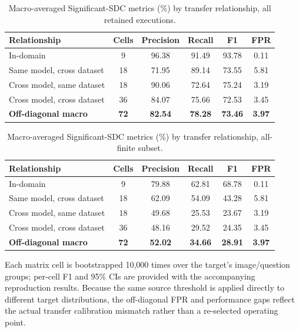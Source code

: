 \begin{table}[!ht]
\caption{Macro-averaged Significant-SDC metrics (\%) by transfer relationship, all retained executions.}
\label{tab:A9}
\centering
\small
\begin{tabular}{lccccc}
\toprule
\textbf{Relationship} & \textbf{Cells} & \textbf{Precision} & \textbf{Recall} & \textbf{F1} & \textbf{FPR} \\
\midrule
In-domain & 9 & 96.38 & 91.49 & 93.78 & 0.11 \\
Same model, cross dataset & 18 & 71.95 & 89.14 & 73.55 & 5.81 \\
Cross model, same dataset & 18 & 90.06 & 72.64 & 75.24 & 3.19 \\
Cross model, cross dataset & 36 & 84.07 & 75.66 & 72.53 & 3.45 \\
\midrule
\textbf{Off-diagonal macro} & \textbf{72} & \textbf{82.54} & \textbf{78.28} & \textbf{73.46} & \textbf{3.97} \\
\bottomrule
\end{tabular}
\end{table}

\begin{table}[!ht]
\caption{Macro-averaged Significant-SDC metrics (\%) by transfer relationship, all-finite subset.}
\label{tab:A10}
\centering
\small
\begin{tabular}{lccccc}
\toprule
\textbf{Relationship} & \textbf{Cells} & \textbf{Precision} & \textbf{Recall} & \textbf{F1} & \textbf{FPR} \\
\midrule
In-domain & 9 & 79.88 & 62.81 & 68.78 & 0.11 \\
Same model, cross dataset & 18 & 62.09 & 54.09 & 43.28 & 5.81 \\
Cross model, same dataset & 18 & 49.68 & 25.53 & 23.67 & 3.19 \\
Cross model, cross dataset & 36 & 48.16 & 29.52 & 24.35 & 3.45 \\
\midrule
\textbf{Off-diagonal macro} & \textbf{72} & \textbf{52.02} & \textbf{34.66} & \textbf{28.91} & \textbf{3.97} \\
\bottomrule
\end{tabular}
\end{table}

Each matrix cell is bootstrapped 10{,}000 times over the target's image/question groups; per-cell F1 and 95\% CIs are provided with the accompanying reproduction results. Because the same source threshold is applied directly to different target distributions, the off-diagonal FPR and performance gaps reflect the actual transfer calibration mismatch rather than a re-selected operating point.


